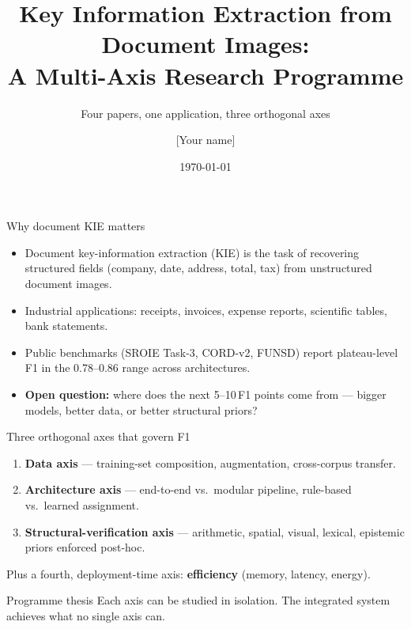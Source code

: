 \documentclass{beamer}
\title{Key Information Extraction from Document Images:\\
       A Multi-Axis Research Programme}
\subtitle{Four papers, one application, three orthogonal axes}
\author{[Your name]}
\date{\today}
\begin{document}
\begin{frame}
  \titlepage
\end{frame}

\begin{frame}{Why document KIE matters}
  \begin{itemize}
    \item Document key-information extraction (KIE) is the task of
          recovering structured fields (\textsf{company}, \textsf{date},
          \textsf{address}, \textsf{total}, \textsf{tax}) from unstructured
          document images.
    \item Industrial applications: receipts, invoices, expense reports,
          scientific tables, bank statements.
    \item Public benchmarks (SROIE Task-3, CORD-v2, FUNSD) report
          plateau-level F1 in the 0.78--0.86 range across architectures.
    \item \textbf{Open question:} where does the next 5--10\,F1 points come
          from --- bigger models, better data, or better
          structural priors?
  \end{itemize}
\end{frame}

\begin{frame}{Three orthogonal axes that govern F1}
  \begin{enumerate}
    \item \textbf{Data axis} --- training-set composition, augmentation,
          cross-corpus transfer.
    \item \textbf{Architecture axis} --- end-to-end vs.\ modular pipeline,
          rule-based vs.\ learned assignment.
    \item \textbf{Structural-verification axis} --- arithmetic,
          spatial, visual, lexical, epistemic priors enforced
          post-hoc.
  \end{enumerate}
  \vspace{0.5em}
  Plus a fourth, deployment-time axis: \textbf{efficiency} (memory,
  latency, energy).
  \vspace{1em}
  \begin{block}{Programme thesis}
    Each axis can be studied in isolation.  The integrated system
    achieves what no single axis can.
  \end{block}
\end{frame}
\end{document}

